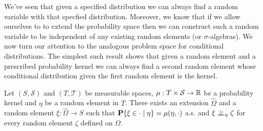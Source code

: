  We've seen that given a specified distribution we can always find a
random variable with that specfied distribution.  Moreover, we know
that if we allow ourselves to to extend the probability space then we
can construct such a random variable to be independent of any existing
random elements (or $\sigma$-algebras).  We now turn our attention to
the analogous problem space for conditional distributions.  The
simplest such result shows that given a random element and a
prescribed probability kernel we can always find a second random
element whose conditional distribution given the first random element is the kernel.
\begin{lem}Let $(S, \mathcal{S})$ and $(T, \mathcal{T})$ be measurable
  spaces, $\mu : T \times \mathcal{S} \to \mathbb{R}$ be a
  probability kernel and $\eta$ be a random element in $T$.  There
  exists an extension $\hat{\Omega}$ and a random element $\xi : \hat{\Omega} \to S$
  such that $\textbf{P}\{\xi \in \cdot \mid \eta\} = \mu(\eta, \cdot)$
  a.s.   and $\xi \perp \! \! \! \perp_{\eta} \zeta$ for every random element
  $\zeta$ defined on $\Omega$.
\end{lem}
